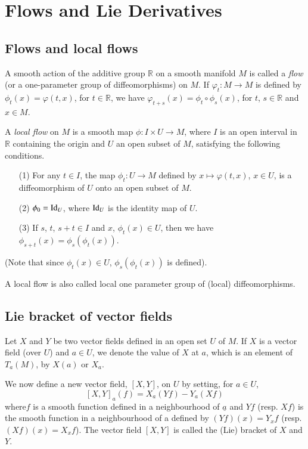 \chapter{Flows and Lie Derivatives}

\section*{Flows and local flows}
\pageoriginale

A smooth action of the additive group $\mathbb{R}$ on a smooth manifold $M$ is called a {\em flow} (or a one-parameter group of diffeomorphisms) on $M$. If $\varphi_{t}:M\to M$ is defined by $\phi_{t}(x)=\varphi(t,x)$, for $t\in \mathbb{R}$, we have $\varphi_{t+s}(x)=\phi_{t}\circ \phi_{s}(x)$, for $t$, $s\in \mathbb{R}$ and $x\in M$.

A {\em local flow} on $M$ is a smooth map $\phi:I\times U\to M$, where $I$ is an open interval in $\mathbb{R}$ containing the origin and $U$ an open subset of $M$, satisfying the following conditions.
\begin{itemize}
\item[(1)] For any $t\in I$, the map $\phi_{t}:U\to M$ defined by $x\mapsto \varphi(t,x)$, $x\in U$, is a diffeomorphism of $U$ onto an open subset of $M$.

\item[(2)] $\phi_{0}=\operatorname{Id}_{U}$, where $\operatorname{Id}_{U}$ is the identity map of $U$.

\item[(3)] If $s$, $t$, $s+t\in I$ and $x$, $\phi_{t}(x)\in U$, then we have $\phi_{s+t}(x)=\phi_{s}(\phi_{t}(x))$.
\end{itemize}
(Note that since $\phi_{t}(x)\in U$, $\phi_{s}(\phi_{t}(x))$ is defined).

A local flow is also called local one parameter group of (local) diffeomorphisms.

\section*{Lie bracket of vector fields}

Let $X$ and $Y$ be two vector fields defined in an open set $U$ of $M$. If $X$ is a vector field (over $U$) and $a\in U$, we denote the value of $X$ at $a$, which is an element of $T_{a}(M)$, by $X(a)$ or $X_{a}$.

We now define a new vector field, $[X,Y]$, on $U$ by setting, for $a\in U$,
$$
[X,Y]_{a}(f)=X_{a}(Yf)-Y_{a}(Xf)
$$
where\pageoriginale $f$ is a smooth function defined in a neighbourhood of $\underline{a}$ and $Yf$ (resp. $Xf$) is the smooth function in a neighbourhood of a defined by $(Yf)(x)=Y_{x}f$ (resp. $(Xf)(x)=X_{x}f$). The vector field $[X,Y]$ is called the (Lie) bracket of $X$ and $Y$.

